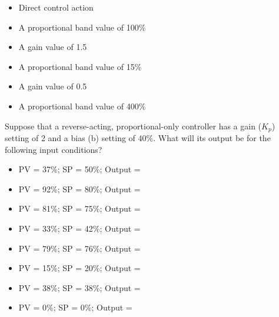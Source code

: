 \begin{itemize}
\item{} Direct control action
\vskip 5pt 
\item{} A proportional band value of 100\%
\vskip 5pt 
\item{} A gain value of 1.5
\vskip 5pt 
\item{} A proportional band value of 15\%
\vskip 5pt 
\item{} A gain value of 0.5
\vskip 5pt 
\item{} A proportional band value of 400\%
\end{itemize}








Suppose that a reverse-acting, proportional-only controller has a gain ($K_p$) setting of 2 and a bias (b) setting of 40\%.  What will its output be for the following input conditions?

\begin{itemize}
\item{}PV = 37\%; SP = 50\%; Output = \underbar{\hskip 50pt}
\vskip 5pt
\item{}PV = 92\%; SP = 80\%; Output = \underbar{\hskip 50pt}
\vskip 5pt
\item{}PV = 81\%; SP = 75\%; Output = \underbar{\hskip 50pt}
\vskip 5pt
\item{}PV = 33\%; SP = 42\%; Output = \underbar{\hskip 50pt}
\vskip 5pt
\item{}PV = 79\%; SP = 76\%; Output = \underbar{\hskip 50pt}
\vskip 5pt
\item{}PV = 15\%; SP = 20\%; Output = \underbar{\hskip 50pt}
\vskip 5pt
\item{}PV = 38\%; SP = 38\%; Output = \underbar{\hskip 50pt}
\vskip 5pt
\item{}PV = 0\%; SP = 0\%; Output = \underbar{\hskip 50pt}
\end{itemize} 







